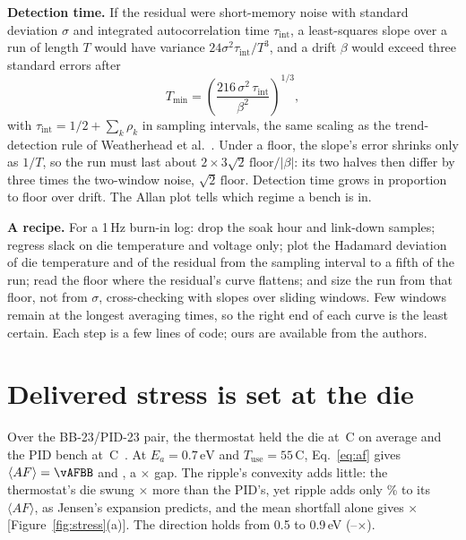 \documentclass[10pt,twocolumn]{article}
\newcommand{\Tmin}{T_{\min}}
\newcommand{\tint}{\tau_{\mathrm{int}}}
\newcommand{\degC}{\,\textdegree C}
\newcommand{\unit}[1]{\,\mathrm{#1}}
\begin{document}
\textbf{Detection time.} If the residual were short-memory noise with standard deviation $\sigma$ and integrated autocorrelation time $\tint$, a least-squares slope over a run of length $T$ would have variance $24\sigma^2\tint/T^3$, and a drift $\beta$ would exceed three standard errors after
\begin{equation}
\Tmin=\left(\frac{216\,\sigma^2\,\tint}{\beta^2}\right)^{1/3},
\label{eq:tmin}
\end{equation}
with $\tint=1/2+\sum_k\rho_k$ in sampling intervals, the same scaling as the trend-detection rule of Weatherhead et al.~\cite{weatherhead}. Under a floor, the slope's error shrinks only as $1/T$, so the run must last about $2\times3\sqrt2\,\mathrm{floor}/|\beta|$: its two halves then differ by three times the two-window noise, $\sqrt2\,\mathrm{floor}$. Detection time grows in proportion to floor over drift. The Allan plot tells which regime a bench is in.

\textbf{A recipe.} For a 1\,Hz burn-in log: drop the soak hour and link-down samples; regress slack on die temperature and voltage only; plot the Hadamard deviation of die temperature and of the residual from the sampling interval to a fifth of the run; read the floor where the residual's curve flattens; and size the run from that floor, not from $\sigma$, cross-checking with slopes over sliding windows. Few windows remain at the longest averaging times, so the right end of each curve is the least certain. Each step is a few lines of code; ours are available from the authors.

\section{Delivered stress is set at the die}

Over the BB-23/PID-23 pair, the thermostat held the die at \vTBB\degC{} on average and the PID bench at \vTPID\degC~\cite{sbcci26}. At $E_a=0.7\unit{eV}$ and $T_{\mathrm{use}}=55$\degC, Eq.~\eqref{eq:af} gives $\langle AF\rangle=\vAFBB$ and \vAFPID, a \vAFratio$\times$ gap. The ripple's convexity adds little: the thermostat's die swung \vTsdRatio$\times$ more than the PID's, yet ripple adds only \vRippleBB\% to its $\langle AF\rangle$, as Jensen's expansion predicts, and the mean shortfall alone gives \vAFratioMeanOnly$\times$ [Figure~\ref{fig:stress}(a)]. The direction holds from 0.5 to 0.9\,eV (\vAFratioLoOne--\vAFratioHiOne$\times$).
\end{document}
